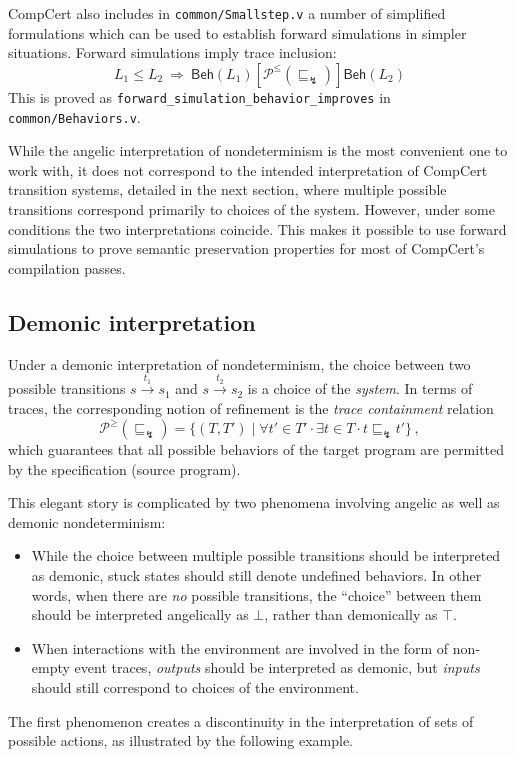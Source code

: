 \documentclass[sigplan,10pt,review,anonymous]{acmart}
\newcommand{\kw}[1]{\ensuremath{ \mathsf{#1} }}
\newcommand{\refby}{\sqsubseteq}
\newcommand{\bdot}{\cdot}
\newcommand{\ifr}[1]{\mathrel{[{#1}]}}
\begin{document}
CompCert also includes in \texttt{common/Smallstep.v}
a number of simplified formulations
which can be used to establish forward simulations
in simpler situations.
Forward simulations imply trace inclusion:
\[
  L_1 \le L_2
  \: \Rightarrow \:
  \kw{Beh}(L_1) \ifr{\mathcal{P}^\le(\refby_\lightning)} \kw{Beh}(L_2)
\]
This is proved as \texttt{forward\_simulation\_behavior\_improves}
in \texttt{common/Behaviors.v}.

While the angelic interpretation
of nondeterminism is the most convenient one to work with,
it does not correspond to the intended interpretation
of CompCert transition systems,
detailed in the next section,
where multiple possible transitions correspond
primarily to choices of the system.
However,
under some conditions
the two interpretations coincide.
This makes it possible to use forward simulations
to prove semantic preservation properties
for most of CompCert's compilation passes.


\subsection{Demonic interpretation} %

Under a demonic interpretation of nondeterminism,
the choice between two possible transitions
$s \stackrel{t_1}{\longrightarrow} s_1$ and
$s \stackrel{t_2}{\longrightarrow} s_2$
is a choice of the \emph{system}.
In terms of traces,
the corresponding notion of refinement
is the \emph{trace containment} relation
\[
  \mathcal{P}^\ge({\refby_\lightning}) =
  \{ (T, T') \mid \forall t' \in T' \bdot \exists t \in T \bdot
    t \refby_\lightning t' \}
  \,,
\]
which guarantees that all possible behaviors of the target program
are permitted by the specification (source program).

This elegant story is complicated by two phenomena
involving angelic as well as demonic nondeterminism:
\begin{itemize}
  \item
    While the choice between multiple possible transitions
    should be interpreted as demonic,
    stuck states should still denote undefined behaviors.
    In other words,
    when there are \emph{no} possible transitions,
    the ``choice'' between them should be interpreted
    angelically as $\bot$,
    rather than demonically as $\top$.
  \item
    When interactions with the environment are involved
    in the form of non-empty event traces,
    \emph{outputs} should be interpreted as demonic,
    but \emph{inputs} should still correspond to
    choices of the environment.
\end{itemize}
The first phenomenon creates a discontinuity
in the interpretation of sets of possible actions,
as illustrated by the following example.
\end{document}
